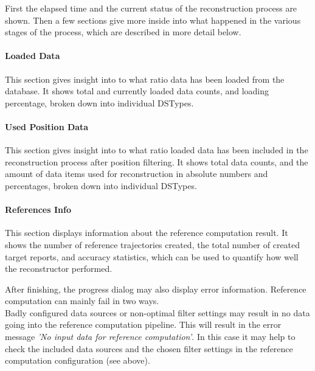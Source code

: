 
First the elapsed time and the current status of the reconstruction process are shown.
Then a few sections give more inside into what happened in the various stages of the process, 
which are described in more detail below.

\paragraph{Loaded Data} This section gives insight into to what ratio data has been loaded from
the database. It shows total and currently loaded data counts, and loading percentage, broken down into
individual DSTypes.

\paragraph{Used Position Data} This section gives insight into to what ratio loaded data has been
included in the reconstruction process after position filtering. 
It shows total data counts, and the amount of data items used for reconstruction in absolute numbers and percentages,
broken down into individual DSTypes.

\paragraph{References Info} This section displays information about the reference computation result.
It shows the number of reference trajectories created, the total number of created target reports, and 
accuracy statistics, which can be used to quantify how well the reconstructor performed.

After finishing, the progress dialog may also display error information. Reference computation can mainly fail in two ways. \\

Badly configured data sources or non-optimal filter settings may result in no data going into the reference computation pipeline.
This will result in the error message \textit{'No input data for reference computation'}. In this case it may help to 
check the included data sources and the chosen filter settings in the reference computation configuration (see above). \\

